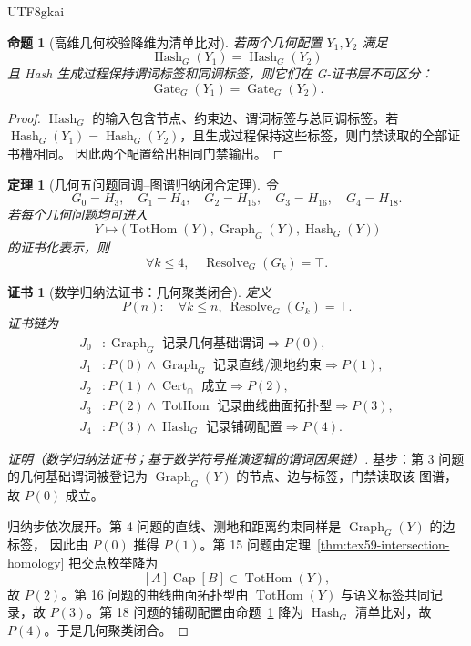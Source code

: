 \documentclass[12pt]{article}
\newtheorem{theorem}{定理}[section]
\newtheorem{proposition}{命题}[section]
\newtheorem{Certificate}{证书}[section]
\DeclareMathOperator{\Cert}{Cert}
\DeclareMathOperator{\Resolve}{Resolve}
\DeclareMathOperator{\Gate}{Gate}
\DeclareMathOperator{\TotHom}{TotHom}
\DeclareMathOperator{\GCap}{Cap}
\DeclareMathOperator{\Graph}{Graph}
\DeclareMathOperator{\Hash}{Hash}
\begin{document}
\begin{CJK*}{UTF8}{gkai}
\begin{proposition}[高维几何校验降维为清单比对]
\label{prop:tex59-hash-check}
若两个几何配置 \(Y_1,Y_2\) 满足
\[
  \Hash_G(Y_1)=\Hash_G(Y_2)
\]
且 Hash 生成过程保持谓词标签和同调标签，则它们在 G-证书层不可区分：
\[
  \Gate_G(Y_1)=\Gate_G(Y_2).
\]
\end{proposition}

\begin{proof}
\(\Hash_G\) 的输入包含节点、约束边、谓词标签与总同调标签。若
\(\Hash_G(Y_1)=\Hash_G(Y_2)\)，且生成过程保持这些标签，则门禁读取的全部证书槽相同。
因此两个配置给出相同门禁输出。
\end{proof}

\begin{theorem}[几何五问题同调--图谱归纳闭合定理]
\label{thm:tex59-geometry-induction}
令
\[
  G_0=H_3,\quad G_1=H_4,\quad G_2=H_{15},\quad G_3=H_{16},\quad G_4=H_{18}.
\]
若每个几何问题均可进入
\[
  Y\longmapsto \bigl(\TotHom(Y),\Graph_G(Y),\Hash_G(Y)\bigr)
\]
的证书化表示，则
\[
  \forall k\le4,\quad \Resolve_G(G_k)=\top.
\]
\end{theorem}

\begin{Certificate}[数学归纳法证书：几何聚类闭合]
\label{cert:tex59-geometry-induction}
定义
\[
  P(n):\quad \forall k\le n,\ \Resolve_G(G_k)=\top.
\]
证书链为
\[
\begin{aligned}
  J_0 &: \Graph_G\text{ 记录几何基础谓词}\Rightarrow P(0),\\
  J_1 &: P(0)\wedge\Graph_G\text{ 记录直线/测地约束}\Rightarrow P(1),\\
  J_2 &: P(1)\wedge\Cert_{\cap}\text{ 成立}\Rightarrow P(2),\\
  J_3 &: P(2)\wedge\TotHom\text{ 记录曲线曲面拓扑型}\Rightarrow P(3),\\
  J_4 &: P(3)\wedge\Hash_G\text{ 记录铺砌配置}\Rightarrow P(4).
\end{aligned}
\]
\end{Certificate}

\begin{proof}[证明（数学归纳法证书；基于数学符号推演逻辑的谓词因果链）]
基步：第 3 问题的几何基础谓词被登记为 \(\Graph_G(Y)\) 的节点、边与标签，门禁读取该
图谱，故 \(P(0)\) 成立。

归纳步依次展开。第 4 问题的直线、测地和距离约束同样是 \(\Graph_G(Y)\) 的边标签，
因此由 \(P(0)\) 推得 \(P(1)\)。第 15 问题由定理~\ref{thm:tex59-intersection-homology}
把交点枚举降为
\[
  [A]\GCap[B]\in\TotHom(Y),
\]
故 \(P(2)\)。第 16 问题的曲线曲面拓扑型由 \(\TotHom(Y)\) 与语义标签共同记录，故
\(P(3)\)。第 18 问题的铺砌配置由命题~\ref{prop:tex59-hash-check} 降为
\(\Hash_G\) 清单比对，故 \(P(4)\)。于是几何聚类闭合。
\end{proof}


\end{CJK*}
\end{document}
